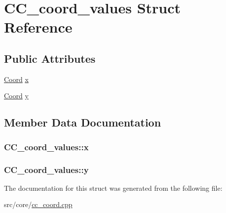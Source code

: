 \hypertarget{a00030}{\section{C\-C\-\_\-coord\-\_\-values Struct Reference}
\label{a00030}
}
\subsection*{Public Attributes}
\begin{DoxyCompactItemize}
\item 
\hyperlink{a00216_acd9dae57b712df0e2d3588c0c4798c11}{Coord} \hyperlink{a00030_aed0bf3a24b9ac6d69a8553d4bab93da7}{x}
\item 
\hyperlink{a00216_acd9dae57b712df0e2d3588c0c4798c11}{Coord} \hyperlink{a00030_a2841a0d89f181387e844622d79e629df}{y}
\end{DoxyCompactItemize}


\subsection{Member Data Documentation}
\hypertarget{a00030_aed0bf3a24b9ac6d69a8553d4bab93da7}{
\subsubsection[{x}]{ C\-C\-\_\-coord\-\_\-values\-::x}}\label{a00030_aed0bf3a24b9ac6d69a8553d4bab93da7}
\hypertarget{a00030_a2841a0d89f181387e844622d79e629df}{
\subsubsection[{y}]{ C\-C\-\_\-coord\-\_\-values\-::y}}\label{a00030_a2841a0d89f181387e844622d79e629df}


The documentation for this struct was generated from the following file\-:\begin{DoxyCompactItemize}
\item 
src/core/\hyperlink{a00203}{cc\-\_\-coord.\-cpp}\end{DoxyCompactItemize}
